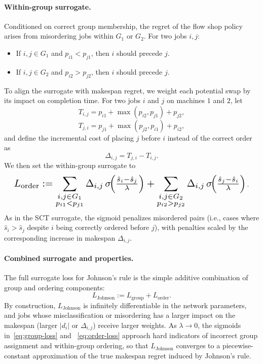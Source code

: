 \documentclass{article}
\begin{document}
\paragraph{Within-group surrogate.}
Conditioned on correct group membership, the regret of the flow shop policy arises
from misordering jobs within $G_1$ or $G_2$.
For two jobs $i,j$:
\begin{itemize}
    \item If $i,j \in G_1$ and $p_{i1} < p_{j1}$, then $i$ should precede $j$.
    \item If $i,j \in G_2$ and $p_{i2} > p_{j2}$, then $i$ should precede $j$.
\end{itemize}
To align the surrogate with makespan regret, we weight each potential swap by
its impact on completion time.
For two jobs $i$ and $j$ on machines $1$ and $2$, let
\begin{equation}
T_{i,j} = p_{i1} + \max(p_{i2},p_{j1}) + p_{j2},
\end{equation}
\begin{equation}
T_{j,i} = p_{j1} + \max(p_{j2},p_{i1}) + p_{i2},
\end{equation}
and define the incremental cost of placing $j$ before $i$ instead of the
correct order as
\begin{equation}
\Delta_{i,j} = T_{j,i} - T_{i,j}.
\end{equation}
We then set the within-group surrogate to
\begin{equation}
\label{eq:order-loss}
\resizebox{0.95\linewidth}{!}{$
\displaystyle
L_{\mathrm{order}}
:=
\sum_{\substack{i,j \in G_1 \\ p_{i1} < p_{j1}}}
\Delta_{i,j}\, \sigma\!\Big( \tfrac{\hat{s}_i - \hat{s}_j}{\lambda} \Big)
 +
\sum_{\substack{i,j \in G_2 \\ p_{i2} > p_{j2}}}
\Delta_{i,j}\, \sigma\!\Big( \tfrac{\hat{s}_j - \hat{s}_i}{\lambda} \Big)
$}\,.
\end{equation}
As in the SCT surrogate, the sigmoid penalizes misordered pairs (i.e., cases where
$\hat{s}_i > \hat{s}_j$ despite $i$ being correctly ordered before $j$), with 
penalties scaled by the corresponding increase in makespan $\Delta_{i,j}$.

\paragraph{Combined surrogate and properties.}
The full surrogate loss for Johnson’s rule is the simple additive combination
of group and ordering components:
\begin{equation}
\label{eq:johnson-loss}
L_{\mathrm{Johnson}}
:=
L_{\mathrm{group}}
+
L_{\mathrm{order}}.
\end{equation}
By construction, $L_{\mathrm{Johnson}}$ is infinitely differentiable in the
network parameters, and jobs whose misclassification or misordering has a
larger impact on the makespan (larger $|d_i|$ or $\Delta_{i,j}$) receive
larger weights.
As $\lambda \to 0$, the sigmoids in~\eqref{eq:group-loss} and
~\eqref{eq:order-loss} approach hard indicators of incorrect group assignment
and within-group ordering, so that $L_{\mathrm{Johnson}}$ converges to a
piecewise-constant approximation of the true makespan regret induced by
Johnson's rule.
\end{document}
